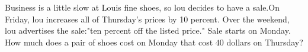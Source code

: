 Business is a little slow at Louis fine shoes, so lou decides to have a sale.On Friday, lou increases all of Thursday's prices by 10 percent. Over the weekend, lou advertises the sale:"ten percent off the listed price." Sale starts on Monday. How much does a pair of shoes cost on Monday that cost $40$ dollars on Thursday?
